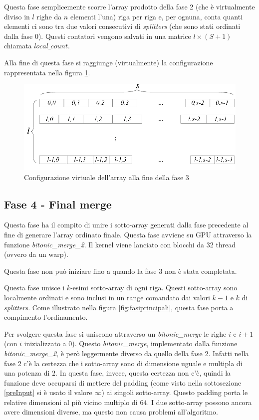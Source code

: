 \documentclass[a4paper, 11pt]{article}
\begin{document}
			Questa fase semplicemente scorre l'array prodotto della fase 2 (che è virtualmente diviso in $l$ righe da $n$ elementi l'una) 
			riga per riga e, per ognuna, conta quanti elementi ci sono tra due valori consecutivi di \emph{splitters} 
			(che sono stati ordinati dalla fase 0). Questi contatori vengono salvati in una matrice $l \times (S+1)$ chiamata $local\_count$.
			
			Alla fine di questa fase si raggiunge (virtualmente) la configurazione rappresentata nella figura \ref{fig:fase3}.
			
			\begin{figure}
				\centering
				\includegraphics[width=0.7\linewidth]{img/fase3}
				\caption{Configurazione virtuale dell'array alla fine della fase 3}
				\label{fig:fase3}
			\end{figure}
			
		\subsection{Fase 4 - Final merge}
			\label{fase4}
			Questa fase ha il compito di unire i sotto-array generati dalla fase precedente al fine di generare l'array ordinato finale.
			Questa fase avviene su GPU attraverso la funzione \emph{bitonic\_merge\_2}.
			Il kernel viene lanciato con blocchi da 32 thread (ovvero da un warp).
			
			Questa fase non può iniziare fino a quando la fase 3 non è stata completata.
			
			Questa fase unisce i $k$-esimi sotto-array di ogni riga. Questi sotto-array sono localmente ordinati e  
			sono inclusi in un range comandato dai valori $k-1$ e $k$ di \emph{splitters}.
			Come illustrato nella figura \ref{fig:fasiprincipali}, questa fase porta a compimento l'ordinamento.
			
			Per svolgere questa fase si uniscono attraverso un \emph{bitonic\_merge} le righe $i$ e $i+1$ (con $i$ inizializzato a $0$). 
			Questo \emph{bitonic\_merge}, implementato dalla funzione \emph{bitonic\_merge\_2}, è però leggermente diverso da quello della fase 2.
			Infatti nella fase 2 c'è la certezza che i sotto-array sono di dimensione uguale e multipla di una potenza di $2$.
			In questa fase, invece, questa certezza non c'è, quindi la funzione deve occuparsi di mettere del padding 
			(come visto nella sottosezione \ref{preInput} si è usato il valore $\infty$)
			ai singoli sotto-array. 
			Questo padding porta le relative dimensioni al più vicino multiplo di $64$.
			I due sotto-array possono ancora avere dimensioni diverse, ma questo non causa problemi all'algoritmo.
			
\end{document}
